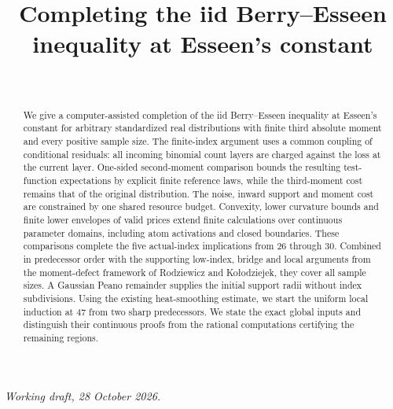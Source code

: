 \documentclass[aop,preprint]{imsart}
\theoremstyle{definition}
\numberwithin{equation}{section}
\begin{document}
\begin{frontmatter}
\title{Completing the iid Berry--Esseen inequality at Esseen's constant}
\begin{aug}
\author[A]{~}
\address[A]{Jiangsu Ocean University}
\end{aug}
\begin{abstract}
We give a computer-assisted completion of the iid Berry--Esseen inequality
at Esseen's constant for arbitrary standardized real distributions with
finite third absolute moment and every positive sample size. The
finite-index argument uses a common coupling of conditional residuals:
all incoming binomial count layers are charged against the loss at the
current layer. One-sided second-moment comparison bounds the resulting
test-function expectations by explicit finite reference laws, while the
third-moment cost remains that of the original distribution. The noise,
inward support and moment cost are constrained by one shared resource
budget. Convexity, lower curvature bounds and finite lower envelopes of
valid prices extend finite calculations over continuous parameter domains,
including atom activations and closed boundaries. These comparisons
complete the five actual-index implications from 26 through 30.
Combined in predecessor order with the supporting low-index, bridge
and local arguments from the moment-defect framework of
Rodziewicz and Ko\l{}odziejek, they cover all sample sizes.
A Gaussian Peano remainder supplies the initial support radii without
index subdivisions. Using the existing heat-smoothing estimate, we start the uniform local induction
at 47 from two sharp predecessors. We state
the exact global inputs and distinguish their continuous proofs from
the rational computations certifying the remaining regions.
\end{abstract}
\begin{keyword}[class=MSC]
\end{keyword}
\begin{keyword}
\end{keyword}
\end{frontmatter}
\noindent\textit{Working draft, 28 October 2026.}
\end{document}
